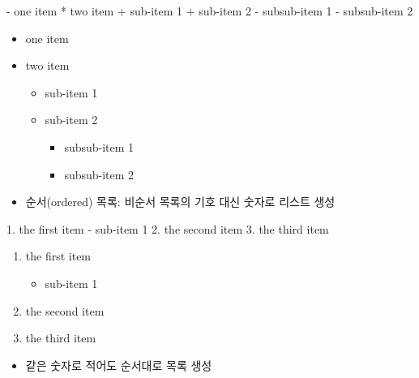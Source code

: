 \documentclass[
  11pt,
]{krantz}
\newenvironment{Shaded}{\begin{snugshade}}{\end{snugshade}}
\newcommand{\NormalTok}[1]{#1}
\newcommand{\StringTok}[1]{\textcolor[rgb]{0.5,0.5,0.5}{#1}}
\providecommand{\tightlist}{%
  \setlength{\itemsep}{0pt}\setlength{\parskip}{0pt}}
\begin{document}
\begin{Shaded}
\begin{Highlighting}[]
\NormalTok{- }\StringTok{one item }
\StringTok{* two item}
\StringTok{   + sub-item 1}
\StringTok{   + sub-item 2}
\StringTok{      - subsub-item 1}
\StringTok{      - subsub-item 2}
\end{Highlighting}
\end{Shaded}

\begin{itemize}
\tightlist
\item
  one item
\item
  two item

  \begin{itemize}
  \tightlist
  \item
    sub-item 1
  \item
    sub-item 2

    \begin{itemize}
    \tightlist
    \item
      subsub-item 1
    \item
      subsub-item 2
    \end{itemize}
  \end{itemize}
\item
  순서(ordered) 목록: 비순서 목록의 기호 대신 숫자로 리스트 생성
\end{itemize}

\begin{Shaded}
\begin{Highlighting}[]
\NormalTok{1. }\StringTok{the first item}
\StringTok{   - sub-item 1}
\StringTok{2. the second item}
\StringTok{3. the third item}
\end{Highlighting}
\end{Shaded}

\begin{enumerate}
\def\labelenumi{\arabic{enumi}.}
\tightlist
\item
  the first item

  \begin{itemize}
  \tightlist
  \item
    sub-item 1
  \end{itemize}
\item
  the second item
\item
  the third item
\end{enumerate}

\begin{itemize}
\tightlist
\item
  같은 숫자로 적어도 순서대로 목록 생성
\end{itemize}
\end{document}
